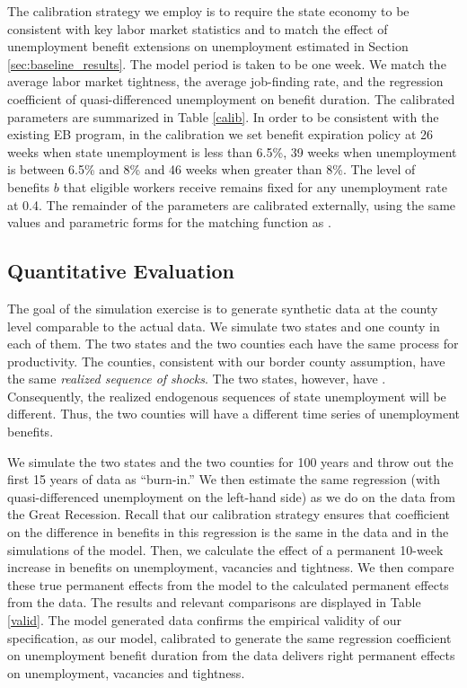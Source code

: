\documentclass[12pt]{article}
\newcommand{\1}{\mathbf{1}}
\begin{document}
\begin{appendix}
The calibration strategy we employ is to require the state economy to be consistent with key labor market statistics and to match the effect of unemployment benefit extensions on unemployment estimated in Section \ref{sec:baseline_results}. The model period is taken to be one week.  We match the average labor market tightness, the average job-finding rate, and the regression coefficient of quasi-differenced unemployment on benefit duration.  The calibrated parameters are summarized in  Table \ref{calib}.  In order to be consistent with the existing EB program, in the calibration we set benefit expiration policy at 26 weeks when state unemployment is less than 6.5\%, 39 weeks when unemployment is between 6.5\% and 8\% and 46 weeks when greater than 8\%. The level of benefits $b$ that eligible workers receive remains fixed for any unemployment rate at 0.4. The remainder of the parameters are calibrated externally, using the same values and parametric forms for the matching function as \citet{hagedorn+manovskii:08}.

\subsection{Quantitative Evaluation}

The goal of the simulation exercise is to generate synthetic data at the county level comparable to the actual data.  We simulate two states and one county in each of them. The two states and the two counties each have the same process for productivity.  The counties, consistent with our border county assumption, have the same \textit{realized sequence of shocks}.  The two states, however, have .  Consequently, the realized endogenous sequences of state unemployment will be different.  Thus, the two counties will have a different time series of unemployment benefits.

We simulate the two states and the two counties for 100 years and throw out the first 15 years of data as ``burn-in.''  We then estimate the same regression (with quasi-differenced unemployment on the left-hand side) as we do on the data from the Great Recession. Recall that our calibration strategy ensures that coefficient on the difference in benefits in this regression is the same in the data and in the simulations of the model. Then, we calculate the effect of a permanent 10-week increase in benefits on unemployment, vacancies and tightness.  We then compare these true permanent effects from the model to the calculated permanent effects from the data. The results and relevant comparisons are displayed in Table \ref{valid}.  The model generated data confirms the empirical validity of our specification, as our model, calibrated to generate the same regression coefficient on unemployment benefit duration from the data delivers right permanent effects on unemployment, vacancies and tightness.





\end{appendix}
\end{document}

